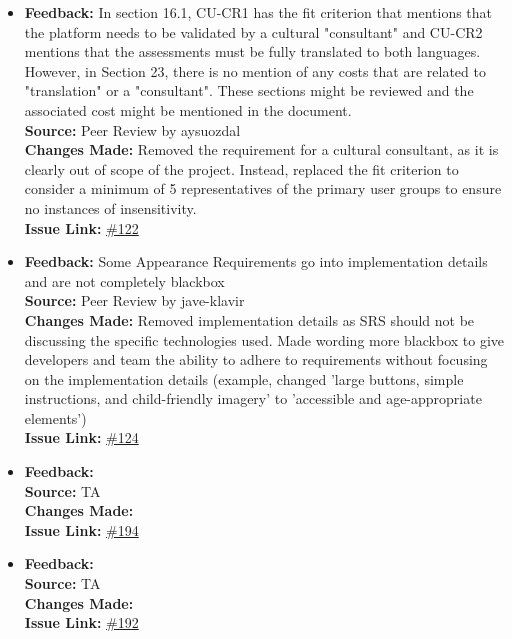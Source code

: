 \documentclass{article}
\begin{document}
\begin{itemize}
  \item 
    \textbf{Feedback:} In section 16.1, CU-CR1 has the fit criterion that mentions that the platform needs to be validated by a cultural "consultant" and CU-CR2 mentions that the assessments must be fully translated to both languages. However, in Section 23, there is no mention of any costs that are related to "translation" or a "consultant". These sections might be reviewed and the associated cost might be mentioned in the document. \\
    \textbf{Source:} Peer Review by aysuozdal\\
    \textbf{Changes Made:} Removed the requirement for a cultural consultant, as it is clearly out of scope of the project. Instead, replaced the fit criterion to consider a minimum of 5 representatives of the primary user groups to ensure no instances of insensitivity.\\
    \textbf{Issue Link:} \href{https://github.com/parishanizam/TeleHealth/issues/122}{\#122}
  
  \item 
    \textbf{Feedback:} Some Appearance Requirements go into implementation details and are not completely blackbox\\
    \textbf{Source:} Peer Review by jave-klavir\\
    \textbf{Changes Made:} Removed implementation details as SRS should not be discussing the specific technologies used. Made wording more blackbox to give developers and team the ability to adhere to requirements without focusing on the implementation details (example, changed 'large buttons, simple instructions, and child-friendly imagery' to 'accessible and age-appropriate elements')\\
    \textbf{Issue Link:} \href{https://github.com/parishanizam/TeleHealth/issues/124}{\#124}
  
  \item 
    \textbf{Feedback:}  \\
    \textbf{Source:} TA \\
    \textbf{Changes Made:} \\
    \textbf{Issue Link:} \href{https://github.com/parishanizam/TeleHealth/issues/194}{\#194}
  
  \item 
    \textbf{Feedback:}  \\
    \textbf{Source:} TA \\
    \textbf{Changes Made:} \\
    \textbf{Issue Link:} \href{https://github.com/parishanizam/TeleHealth/issues/192}{\#192}


\end{itemize}
\end{document}
